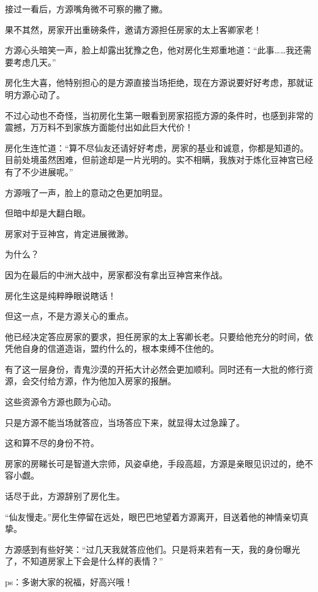 \begin{this_body}
接过一看后，方源嘴角微不可察的撇了撇。

果不其然，房家开出重磅条件，邀请方源担任房家的太上客卿家老！

方源心头暗笑一声，脸上却露出犹豫之色，他对房化生郑重地道：“此事……我还需要考虑几天。”

房化生大喜，他特别担心的是方源直接当场拒绝，现在方源说要好好考虑，那就证明方源心动了。

不过心动也不奇怪，当初房化生第一眼看到房家招揽方源的条件时，也感到非常的震撼，万万料不到家族方面能付出如此巨大代价！

房化生连忙道：“算不尽仙友还请好好考虑，房家的基业和诚意，你都是知道的。目前处境虽然困难，但前途却是一片光明的。实不相瞒，我族对于炼化豆神宫已经有了不少进展呢。”

方源哦了一声，脸上的意动之色更加明显。

但暗中却是大翻白眼。

房家对于豆神宫，肯定进展微渺。

为什么？

因为在最后的中洲大战中，房家都没有拿出豆神宫来作战。

房化生这是纯粹睁眼说瞎话！

但这一点，不是方源关心的重点。

他已经决定答应房家的要求，担任房家的太上客卿长老。只要给他充分的时间，依凭他自身的信道造诣，盟约什么的，根本束缚不住他的。

有了这一层身份，青鬼沙漠的开拓大计必然会更加顺利。同时还有一大批的修行资源，会交付给方源，作为他加入房家的报酬。

这些资源令方源也颇为心动。

只是方源不能当场就答应，当场答应下来，就显得太过急躁了。

这和算不尽的身份不符。

房家的房睇长可是智道大宗师，风姿卓绝，手段高超，方源是亲眼见识过的，绝不容小觑。

话尽于此，方源辞别了房化生。

“仙友慢走。”房化生停留在远处，眼巴巴地望着方源离开，目送着他的神情亲切真挚。

方源感到有些好笑：“过几天我就答应他们。只是将来若有一天，我的身份曝光了，不知道房家上下会是什么样的表情？”

ps：多谢大家的祝福，好高兴哦！

\end{this_body}

